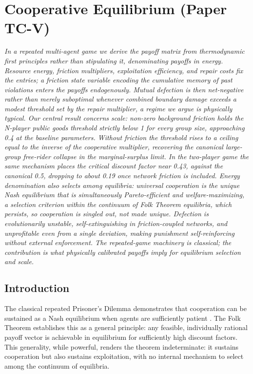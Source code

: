 \documentclass[11pt]{article}
\theoremstyle{plain}
\theoremstyle{definition}
\theoremstyle{remark}
\let\origsection\section
\renewcommand{\section}{\needspace{12\baselineskip}\origsection}
\let\origsubsection\subsection
\renewcommand{\subsection}{\needspace{7\baselineskip}\origsubsection}
\begin{document}
\section{Cooperative Equilibrium (Paper TC-V)}\label{app-V}

\emph{In a repeated multi-agent game we derive the payoff matrix from
thermodynamic first principles rather than stipulating it, denominating
payoffs in energy. Resource energy, friction multipliers, exploitation
efficiency, and repair costs fix the entries; a friction state variable
encoding the cumulative memory of past violations enters the payoffs
endogenously. Mutual defection is then net-negative rather than merely
suboptimal whenever combined boundary damage exceeds a modest threshold
set by the repair multiplier, a regime we argue is physically typical.
Our central result concerns scale: non-zero background friction holds
the N-player public goods threshold strictly below 1 for every group
size, approaching 0.4 at the baseline parameters. Without friction the
threshold rises to a ceiling equal to the inverse of the cooperative
multiplier, recovering the canonical large-group free-rider collapse in
the marginal-surplus limit. In the two-player game the same mechanism
places the critical discount factor near 0.43, against the canonical
0.5, dropping to about 0.19 once network friction is included. Energy
denomination also selects among equilibria: universal cooperation is the
unique Nash equilibrium that is simultaneously Pareto-efficient and
welfare-maximizing, a selection criterion within the continuum of Folk
Theorem equilibria, which persists, so cooperation is singled out, not
made unique. Defection is evolutionarily unstable, self-extinguishing in
friction-coupled networks, and unprofitable even from a single
deviation, making punishment self-reinforcing without external
enforcement. The repeated-game machinery is classical; the contribution
is what physically calibrated payoffs imply for equilibrium selection
and scale.}

\subsection{Introduction}\label{introduction-5}

The classical repeated Prisoner's Dilemma demonstrates that cooperation
can be sustained as a Nash equilibrium when agents are sufficiently
patient \citep{Fudenberg1986, Fudenberg1991}. The Folk Theorem
establishes this as a general principle: any feasible, individually
rational payoff vector is achievable in equilibrium for sufficiently
high discount factors. This generality, while powerful, renders the
theorem indeterminate: it sustains cooperation but also sustains
exploitation, with no internal mechanism to select among the continuum
of equilibria.
\end{document}
